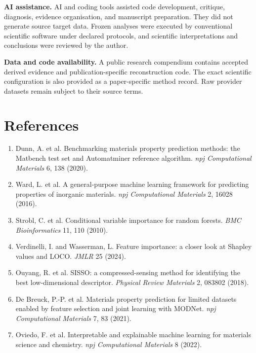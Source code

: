 \documentclass[10pt,a4paper]{article}
\begin{document}
\textbf{AI assistance.} AI and coding tools assisted code development, critique, diagnosis, evidence organisation, and manuscript preparation. They did not generate source target data. Frozen analyses were executed by conventional scientific software under declared protocols, and scientific interpretations and conclusions were reviewed by the author.

\textbf{Data and code availability.} A public research compendium contains accepted derived evidence and publication-specific reconstruction code. The exact scientific configuration is also provided as a paper-specific method record. Raw provider datasets remain subject to their source terms.

\section*{References}\small
\begin{enumerate}
\item Dunn, A. et al. Benchmarking materials property prediction methods: the Matbench test set and Automatminer reference algorithm. \emph{npj Computational Materials} 6, 138 (2020).
\item Ward, L. et al. A general-purpose machine learning framework for predicting properties of inorganic materials. \emph{npj Computational Materials} 2, 16028 (2016).
\item Strobl, C. et al. Conditional variable importance for random forests. \emph{BMC Bioinformatics} 11, 110 (2010).
\item Verdinelli, I. and Wasserman, L. Feature importance: a closer look at Shapley values and LOCO. \emph{JMLR} 25 (2024).
\item Ouyang, R. et al. SISSO: a compressed-sensing method for identifying the best low-dimensional descriptor. \emph{Physical Review Materials} 2, 083802 (2018).
\item De Breuck, P.-P. et al. Materials property prediction for limited datasets enabled by feature selection and joint learning with MODNet. \emph{npj Computational Materials} 7, 83 (2021).
\item Oviedo, F. et al. Interpretable and explainable machine learning for materials science and chemistry. \emph{npj Computational Materials} 8 (2022).
\end{enumerate}
\end{document}
